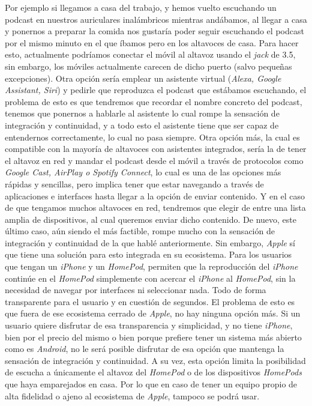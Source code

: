Por ejemplo si llegamos a casa del trabajo, y hemos vuelto escuchando un podcast en nuestros auriculares inalámbricos mientras andábamos, al llegar a casa y ponernos a preparar la comida nos gustaría poder seguir escuchando el podcast por el mismo minuto en el que íbamos pero en los altavoces de casa. Para hacer esto, actualmente podríamos conectar el móvil al altavoz usando el \emph{jack} de 3.5, sin embargo, los móviles actualmente carecen de dicho puerto (salvo pequeñas excepciones). Otra opción sería emplear un asistente virtual (\emph{Alexa, Google Assistant, Siri}) y pedirle que reproduzca el podcast que estábamos escuchando, el problema de esto es que tendremos que recordar el nombre concreto del podcast, tenemos que ponernos a hablarle al asistente lo cual rompe la sensación de integración y continuidad, y a todo esto el asistente tiene que ser capaz de entendernos correctamente, lo cual no pasa siempre. Otra opción más, la cual es compatible con la mayoría de altavoces con asistentes integrados, sería la de tener el altavoz en red y mandar el podcast desde el móvil a través de protocolos como \emph{Google Cast, AirPlay o Spotify Connect}, lo cual es una de las opciones más rápidas y sencillas, pero implica tener que estar navegando a través de aplicaciones e interfaces hasta llegar a la opción de enviar contenido. Y en el caso de que tengamos muchos altavoces en red, tendremos que elegir de entre una lista amplia de dispositivos, al cual queremos enviar dicho contenido. De nuevo, este último caso, aún siendo el más factible, rompe mucho con la sensación de integración y continuidad de la que hablé anteriormente. Sin embargo, \emph{Apple} sí que tiene una solución para esto integrada en su ecosistema. Para los usuarios que tengan un \emph{iPhone} y un \emph{HomePod}, permiten que la reproducción del \emph{iPhone} continúe en el \emph{HomePod} simplemente con acercar el \emph{iPhone} al \emph{HomePod}, sin la necesidad de navegar por interfaces ni seleccionar nada. Todo de forma transparente para el usuario y en cuestión de segundos. El problema de esto es que fuera de ese ecosistema cerrado de \emph{Apple}, no hay ninguna opción más. Si un usuario quiere disfrutar de esa transparencia y simplicidad, y no tiene \emph{iPhone}, bien por el precio del mismo o bien porque prefiere tener un sistema más abierto como es \emph{Android}, no le será posible disfrutar de esa opción que mantenga la sensación de integración y continuidad. A su vez, esta opción limita la posibilidad de escucha a únicamente el altavoz del \emph{HomePod} o de los dispositivos \emph{HomePods} que haya emparejados en casa. Por lo que en caso de tener un equipo propio de alta fidelidad o ajeno al ecosistema de \emph{Apple}, tampoco se podrá usar.\\

